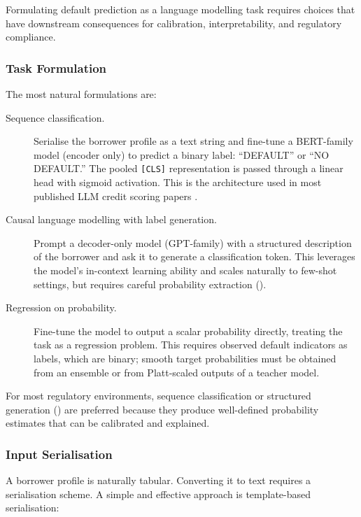 \begin{context}
Formulating default prediction as a language modelling task requires choices that have downstream consequences for calibration, interpretability, and regulatory compliance.

\subsubsection*{Task Formulation}

The most natural formulations are:

\begin{description}
  \item[Sequence classification.] Serialise the borrower profile as a text string and fine-tune a BERT-family model (encoder only) to predict a binary label: ``DEFAULT'' or ``NO DEFAULT.'' The pooled \texttt{[CLS]} representation is passed through a linear head with sigmoid activation. This is the architecture used in most published LLM credit scoring papers \cite{yang2020finbert}.

  \item[Causal language modelling with label generation.] Prompt a decoder-only model (GPT-family) with a structured description of the borrower and ask it to generate a classification token. This leverages the model's in-context learning ability and scales naturally to few-shot settings, but requires careful probability extraction ().

  \item[Regression on probability.] Fine-tune the model to output a scalar probability directly, treating the task as a regression problem. This requires observed default indicators as labels, which are binary; smooth target probabilities must be obtained from an ensemble or from Platt-scaled outputs of a teacher model.
\end{description}

For most regulatory environments, sequence classification or structured generation () are preferred because they produce well-defined probability estimates that can be calibrated and explained.

\subsubsection*{Input Serialisation}

A borrower profile is naturally tabular. Converting it to text requires a serialisation scheme. A simple and effective approach is template-based serialisation:


\end{context}
